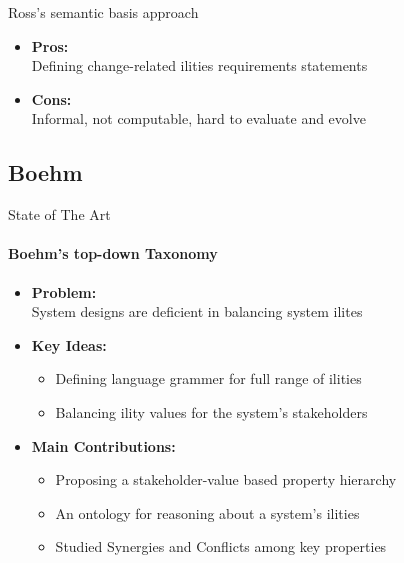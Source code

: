 \documentclass[xcolor=x11names,compress]{beamer}
\renewcommand{\(}{\begin{columns}}
\renewcommand{\)}{\end{columns}}
\newcommand{\<}[1]{\begin{column}{#1}}
\renewcommand{\>}{\end{column}}
\begin{document}

\begin{frame}{Ross's semantic basis approach}
\begin{itemize}
\item \textbf{Pros:} \\
	Defining change-related ilities requirements statements
\item \textbf{Cons:} \\
	Informal, not computable, hard to evaluate and evolve
\end{itemize}
\end{frame}

\subsection{Boehm}
\begin{frame}{State of The Art}
\framesubtitle{Boehm's top-down Taxonomy \cite{Boehm:ontology}}
\begin{itemize}
\item \textbf{Problem:}\\System designs are deficient in balancing system ilites
\item \textbf{Key Ideas:}
	\begin{itemize}
	\item Defining language grammer for full range of ilities
	\item Balancing ility values for the system's stakeholders
	\end{itemize}
\item \textbf{Main Contributions:}
\begin{itemize}
\item Proposing a stakeholder-value based property hierarchy
\item An ontology for reasoning about a system's ilities
\item Studied Synergies and Conflicts among key properties
\end{itemize}
\end{itemize}
\end{frame}

\end{document}
